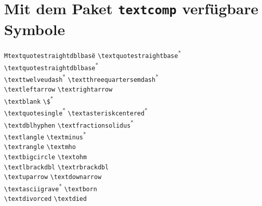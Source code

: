 
\appendix

\enlargethispage*{2.5\baselineskip}

\section{Mit dem Paket \texttt{textcomp} verfügbare Symbole}
\label{textsymbols}
{\small
\begin{tabbing}
\quad\quad\=\texttt{Mtextquotestraightdblbase}\hspace{1cm}\=\quad\quad\=\kill
\textquotestraightbase \> \lstinline+\textquotestraightbase+\textsuperscript{*}  \> \textquotestraightdblbase \> \lstinline+\textquotestraightdblbase+\textsuperscript{*} \\
\texttwelveudash \> \lstinline+\texttwelveudash+\textsuperscript{*}  \> \textthreequartersemdash \> \lstinline+\textthreequartersemdash+\textsuperscript{*} \\
\textleftarrow \> \lstinline+\textleftarrow+ \> \textrightarrow \> \lstinline+\textrightarrow+\\
\textblank \> \lstinline+\textblank+ \> \textdollar \> \lstinline+\$+\textsuperscript{*} \\
\textquotesingle \> \lstinline+\textquotesingle+\textsuperscript{*}  \> \textasteriskcentered \> \lstinline+\textasteriskcentered+\textsuperscript{*} \\
\textdblhyphen \> \lstinline+\textdblhyphen+ \> \textfractionsolidus \> \lstinline+\textfractionsolidus+\textsuperscript{*} \\
\textlangle \> \lstinline+\textlangle+ \> \textminus \> \lstinline+\textminus+\textsuperscript{*} \\
\textrangle \> \lstinline+\textrangle+ \> \textmho \> \lstinline+\textmho+\\
\textbigcircle \> \lstinline+\textbigcircle+ \> \textohm \> \lstinline+\textohm+\\
\textlbrackdbl \> \lstinline+\textlbrackdbl+ \> \textrbrackdbl \> \lstinline+\textrbrackdbl+\\
\textuparrow \> \lstinline+\textuparrow+ \> \textdownarrow \> \lstinline+\textdownarrow+\\
\textasciigrave \> \lstinline+\textasciigrave+\textsuperscript{*}  \> \textborn \> \lstinline+\textborn+\\
\textdivorced \> \lstinline+\textdivorced+ \> \textdied \> \lstinline+\textdied+\\

\end{tabbing}}
